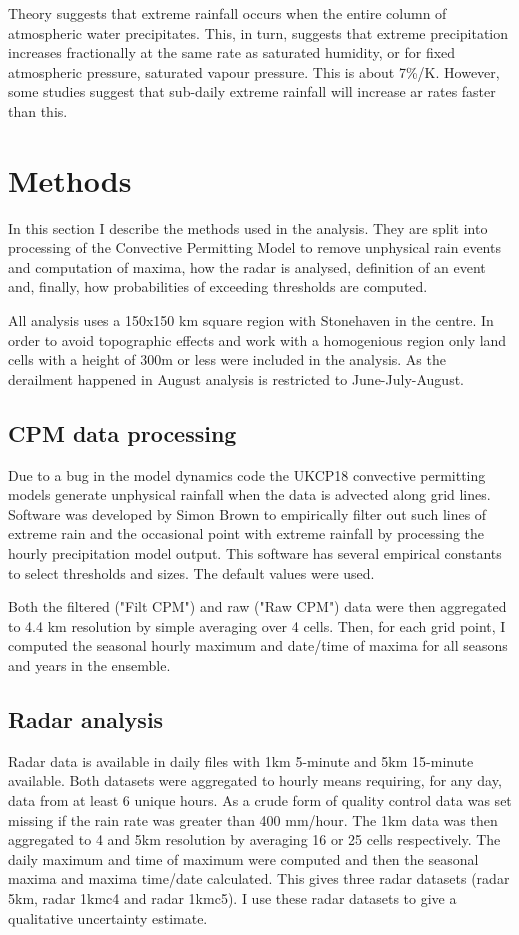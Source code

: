 \documentclass[11pt,a4paper]{article}
\begin{document}
Theory\parencite{allen02insight} suggests that extreme rainfall occurs when the entire column of atmospheric water precipitates. This, in turn,  suggests that extreme precipitation increases fractionally at the same rate as saturated humidity, or for fixed atmospheric pressure, saturated vapour pressure. This is about 7\%/K. However, some studies suggest that sub-daily extreme rainfall  will increase  ar rates faster than this. 



\section{Methods}
In this section I describe the methods used in the analysis. They are split into processing of the Convective Permitting Model to remove unphysical rain events  and computation of maxima, how the radar is analysed, definition of an event and, finally, how probabilities of exceeding thresholds are computed. 

All analysis uses a 150x150 km square region with Stonehaven in the centre. In order to avoid topographic effects and work with a homogenious region only land cells with a height of 300m or less were included in the analysis. As the derailment happened in August analysis is restricted to June-July-August. 

\subsection{CPM data processing}

Due to a bug in the model dynamics code the UKCP18 convective permitting models generate unphysical rainfall when the data is advected along grid lines. Software was developed by Simon Brown to empirically filter out such lines of extreme rain and the occasional point with extreme rainfall by processing the hourly precipitation model output. This software has several empirical constants to select thresholds and sizes. The default values were used.  

Both the filtered ("Filt CPM") and raw ("Raw CPM") data were then aggregated to 4.4 km resolution by simple averaging over 4 cells. Then, for each grid point, I computed the seasonal hourly maximum and date/time of maxima for all seasons and  years in the ensemble. 

\subsection{Radar analysis}
Radar data is available in daily files with  1km 5-minute and 5km 15-minute available.  Both datasets  were aggregated to hourly means requiring, for any day, data from at least 6  unique hours. As a crude form of quality control data was set missing if the rain rate was greater than 400 mm/hour.  The 1km data was then aggregated to 4 and 5km resolution by averaging 16 or 25 cells respectively. The daily maximum and time of maximum were computed and then the seasonal maxima and maxima time/date calculated. This gives three radar datasets (radar 5km, radar 1kmc4 and radar 1kmc5). I use these radar datasets to give a qualitative uncertainty estimate.
\end{document}
